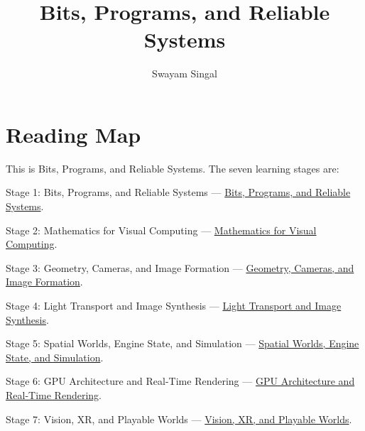 \documentclass[11pt,twoside,openany]{book}
\title{Bits, Programs, and Reliable Systems}
\author{Swayam Singal}
\begin{document}
\maketitle
\begin{center}\end{center}
\hypertarget{volume-reading-map}{}
\chapter*{Reading Map}
\noindent This is Bits, Programs, and Reliable Systems. The seven learning stages are:
\par\noindent Stage 1: Bits, Programs, and Reliable Systems --- \href{../01-Bits-Programs-and-Reliable-Systems/main.pdf}{Bits, Programs, and Reliable Systems}.
\par\noindent Stage 2: Mathematics for Visual Computing --- \href{../02-Mathematics-for-Visual-Computing/main.pdf}{Mathematics for Visual Computing}.
\par\noindent Stage 3: Geometry, Cameras, and Image Formation --- \href{../03-Geometry-Cameras-and-Image-Formation/main.pdf}{Geometry, Cameras, and Image Formation}.
\par\noindent Stage 4: Light Transport and Image Synthesis --- \href{../04-Light-Transport-and-Image-Synthesis/main.pdf}{Light Transport and Image Synthesis}.
\par\noindent Stage 5: Spatial Worlds, Engine State, and Simulation --- \href{../05-Spatial-Worlds-Engine-State-and-Simulation/main.pdf}{Spatial Worlds, Engine State, and Simulation}.
\par\noindent Stage 6: GPU Architecture and Real-Time Rendering --- \href{../06-GPU-Architecture-and-Real-Time-Rendering/main.pdf}{GPU Architecture and Real-Time Rendering}.
\par\noindent Stage 7: Vision, XR, and Playable Worlds --- \href{../07-Vision-XR-and-Playable-Worlds/main.pdf}{Vision, XR, and Playable Worlds}.
\tableofcontents
\mainmatter
\setcounter{chapter}{0}






\end{document}
